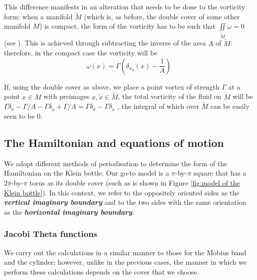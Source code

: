 \documentclass[11pt,twoside]{article}
\theoremstyle{definition}
\numberwithin{equation}{section}
\def\Mt{\widetilde{M}}
\def\defn#1{{\itshape\bfseries#1}}
\begin{document}
This difference manifests in an alteration that needs to be done to the vorticity form: when a manifold $\widetilde{M}$ (which is, as before, the double cover of some other manifold  $M$) is compact, the form of the vorticity has to be such that  $\iint\limits_{\Mt} \omega = 0$ (see \cite{dritschel2015motion}). 
This is achieved through subtracting the inverse of the area $A$ of $\widetilde{M}$: therefore, in the compact case the  vorticity will be 
\begin{equation}
\label{eq: vorticity for compact}
\omega(x) = \Gamma\left(\delta_{x_0}(x) - \frac{1}{A}\right)
\end{equation}

If, using the double cover as above, we place a point vortex of strength $\Gamma$ at a point $x\in M$ with preimages $x,\widetilde{x}\in\widetilde{M}$,  the total vorticity of the fluid on $\widetilde{M}$  will be $\Gamma\delta_{x}  -\Gamma/A - \Gamma\delta_{\widetilde{x}} + \Gamma/A  = \Gamma\delta_{x} - \Gamma\delta_{\widetilde{x}}$ , the integral of which over $\widetilde{M}$ can be easily seen to be 0. 






\subsection{The Hamiltonian and equations of motion}
\label{sec: the Ham and motion equations Klein}
 We adopt different methods of periodisation to determine the form of the Hamiltonian on the Klein bottle. Our go-to model is a $\pi$-by-$\pi$ square that has a $2\pi$-by-$\pi$ torus as its double cover (such as is shown in Figure \ref{fig:model of the Klein bottle}). In this context, we refer to the oppositely oriented  sides as the \defn{vertical imaginary boundary}  and to the two sides with the same orientation as the  \defn{horizontal imaginary boundary}.
 

 



\subsubsection{Jacobi Theta functions}


We carry out the calculations in a similar manner to those for the Mobius band and the cylinder; however, unlike in the previous cases, the manner in which we perform these calculations depends on the cover that we choose. 
\end{document}

